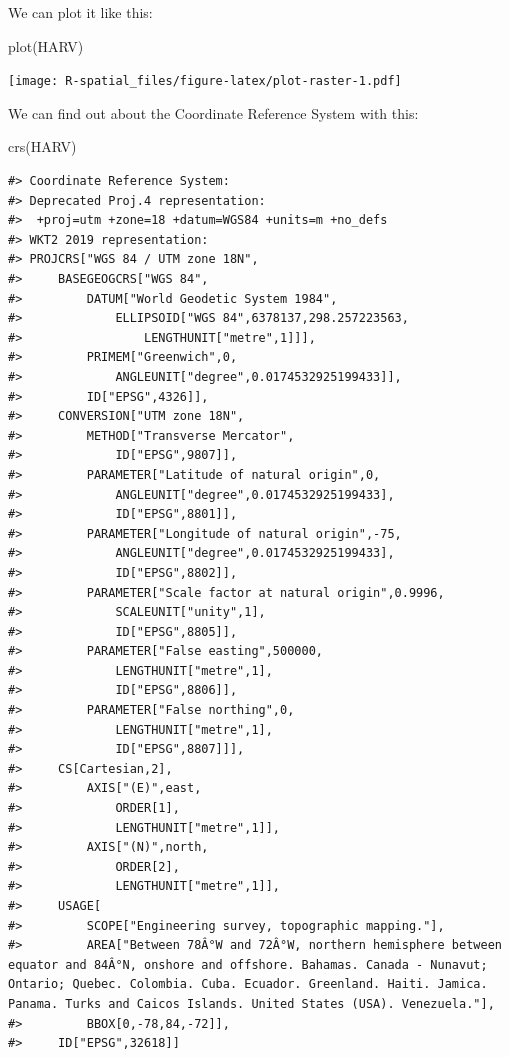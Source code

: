 \documentclass[
  11pt,
]{book}
\newenvironment{Shaded}{\begin{snugshade}}{\end{snugshade}}
\newcommand{\FunctionTok}[1]{\textcolor[rgb]{0.00,0.00,0.00}{#1}}
\newcommand{\NormalTok}[1]{#1}
\begin{document}
We can plot it like this:

\begin{Shaded}
\begin{Highlighting}[]
\FunctionTok{plot}\NormalTok{(HARV)}
\end{Highlighting}
\end{Shaded}

\texttt{[image: R-spatial\_files/figure-latex/plot-raster-1.pdf]}

We can find out about the Coordinate Reference System with this:

\begin{Shaded}
\begin{Highlighting}[]
\FunctionTok{crs}\NormalTok{(HARV)}
\end{Highlighting}
\end{Shaded}

\begin{verbatim}
#> Coordinate Reference System:
#> Deprecated Proj.4 representation:
#>  +proj=utm +zone=18 +datum=WGS84 +units=m +no_defs 
#> WKT2 2019 representation:
#> PROJCRS["WGS 84 / UTM zone 18N",
#>     BASEGEOGCRS["WGS 84",
#>         DATUM["World Geodetic System 1984",
#>             ELLIPSOID["WGS 84",6378137,298.257223563,
#>                 LENGTHUNIT["metre",1]]],
#>         PRIMEM["Greenwich",0,
#>             ANGLEUNIT["degree",0.0174532925199433]],
#>         ID["EPSG",4326]],
#>     CONVERSION["UTM zone 18N",
#>         METHOD["Transverse Mercator",
#>             ID["EPSG",9807]],
#>         PARAMETER["Latitude of natural origin",0,
#>             ANGLEUNIT["degree",0.0174532925199433],
#>             ID["EPSG",8801]],
#>         PARAMETER["Longitude of natural origin",-75,
#>             ANGLEUNIT["degree",0.0174532925199433],
#>             ID["EPSG",8802]],
#>         PARAMETER["Scale factor at natural origin",0.9996,
#>             SCALEUNIT["unity",1],
#>             ID["EPSG",8805]],
#>         PARAMETER["False easting",500000,
#>             LENGTHUNIT["metre",1],
#>             ID["EPSG",8806]],
#>         PARAMETER["False northing",0,
#>             LENGTHUNIT["metre",1],
#>             ID["EPSG",8807]]],
#>     CS[Cartesian,2],
#>         AXIS["(E)",east,
#>             ORDER[1],
#>             LENGTHUNIT["metre",1]],
#>         AXIS["(N)",north,
#>             ORDER[2],
#>             LENGTHUNIT["metre",1]],
#>     USAGE[
#>         SCOPE["Engineering survey, topographic mapping."],
#>         AREA["Between 78Â°W and 72Â°W, northern hemisphere between equator and 84Â°N, onshore and offshore. Bahamas. Canada - Nunavut; Ontario; Quebec. Colombia. Cuba. Ecuador. Greenland. Haiti. Jamica. Panama. Turks and Caicos Islands. United States (USA). Venezuela."],
#>         BBOX[0,-78,84,-72]],
#>     ID["EPSG",32618]]
\end{verbatim}
\end{document}

